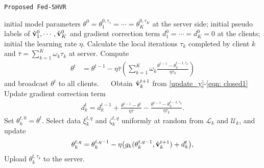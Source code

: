 \documentclass[twoside,journal]{IEEEtran}
\def\VectorFont{\bf}
\newcommand{\vv}{{\VectorFont v}}
\begin{document}
\begin{algorithm}[t!]
	\caption{\texttt{Proposed Fed-SHVR}} %
	\label{alg: model_avg}
	\begin{algorithmic}[1]
		 initial model parameters $\theta^0=\theta_1^{0, \tau_1}=\cdots=\theta_K^{0, \tau_K}$ at the server side; initial pseudo labels of $\hat{\vv}^0_{1},\cdots,\hat{\vv}_{K}^{0}$ and gradient correction term $d_1^0=\cdots= d_K^0=0$ at the clients; initial the learning rate $\eta$.
        \STATE Calculate  the local iterations $\tau_k$ completed by client $k$ and  $\bar{\tau}=\sum_{k=1}^K\omega_k\tau_k$ at server.
		 Compute
		\begin{align}
	\label{eqn: fedSavg theta1} \theta^t &= \theta^{t-1} - \eta\bar{\tau} \left( \sum_{k=1}^K\omega_k\frac{\theta^{t-1}-\theta_k^{t-1,\tau_k}}{\eta \tau_k}\right)
		\end{align}
		and broadcast $\theta^t$ to all clients.		
		~~
        \STATE Obtain $\hat{\vv}_{k}^{t+1}$ from \eqref{update_y}-\eqref{eqn: closed1}
  		\STATE Update gradient correction term
        \begin{align}\label{gradient_corr}
        d_k^t = d_k^{t-1}+\frac{\theta^{t-1}-\theta^t}{\eta \bar{\tau}}-\frac{\theta^{t-1}-\theta_k^{t-1,\tau_k}}{\eta \tau_k}.
        \end{align}
        \STATE Set $\theta_k^{t,0} = \theta^t$.
        \STATE Select data $\xi_k^{t,q}$ and $\zeta_k^{t,q}$ uniformly at random from $\mathcal{L}_k$ and $\mathcal{U}_k$, and update
        \begin{align}\label{update_theta}
        \theta_k^{t,q}=\theta_k^{t,q-1}-\eta  \big(g_k(\theta_k^{t,q-1}, \hat \vv_k^{t+1})+d_k^t\big),
		\end{align}	
		\ENDFOR
		\STATE
		Upload $\theta_k^{t,\tau_k}$ to the server.
		\ENDFOR
		\ENDFOR
	\end{algorithmic}
\end{algorithm}
\end{document}
